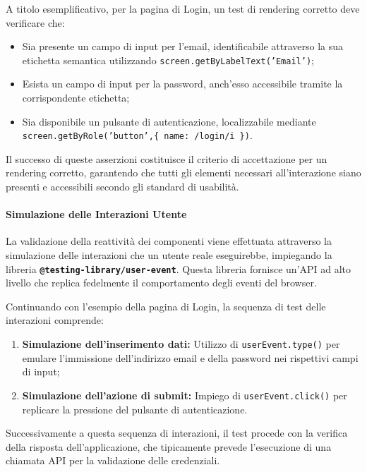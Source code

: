 \documentclass[12pt,a4paper,openright,twoside]{book}
\begin{document}
A titolo esemplificativo, per la pagina di Login, un test di rendering corretto deve verificare che:
\begin{itemize}
    \item Sia presente un campo di input per l'email, identificabile attraverso la sua etichetta semantica utilizzando \texttt{screen.getByLabelText('Email')};
    \item Esista un campo di input per la password, anch'esso accessibile tramite la corrispondente etichetta;
    \item Sia disponibile un pulsante di autenticazione, localizzabile mediante \texttt{screen\allowbreak .getByRole(\allowbreak 'button',\allowbreak \{ name: /login/i \})}.
\end{itemize}

Il successo di queste asserzioni costituisce il criterio di accettazione per un rendering corretto, garantendo che tutti gli elementi necessari all'interazione siano presenti e accessibili secondo gli standard di usabilità.

\paragraph{Simulazione delle Interazioni Utente}

La validazione della reattività dei componenti viene effettuata attraverso la simulazione delle interazioni che un utente reale eseguirebbe, impiegando la libreria \textbf{\texttt{@testing-library/user-event}}. Questa libreria fornisce un'API ad alto livello che replica fedelmente il comportamento degli eventi del browser.

Continuando con l'esempio della pagina di Login, la sequenza di test delle interazioni comprende:
\begin{enumerate}
    \item \textbf{Simulazione dell'inserimento dati:} Utilizzo di \texttt{userEvent.type()} per emulare l'immissione dell'indirizzo email e della password nei rispettivi campi di input;
    \item \textbf{Simulazione dell'azione di submit:} Impiego di \texttt{userEvent.click()} per replicare la pressione del pulsante di autenticazione.
\end{enumerate}

Successivamente a questa sequenza di interazioni, il test procede con la verifica della risposta dell'applicazione, che tipicamente prevede l'esecuzione di una chiamata API per la validazione delle credenziali.
\end{document}
